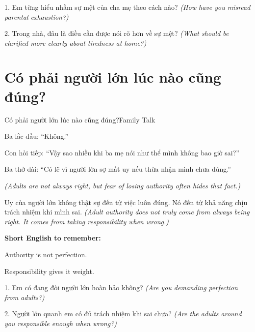 \begin{tuhocnhanh}
1. Em từng hiểu nhầm sự mệt của cha mẹ theo cách nào? \textit{(How have you misread parental exhaustion?)}

2. Trong nhà, đâu là điều cần được nói rõ hơn về sự mệt? \textit{(What should be clarified more clearly about tiredness at home?)}
\end{tuhocnhanh}
\ngancach

\section{Có phải người lớn lúc nào cũng đúng?}
\begin{truyen}{Có phải người lớn lúc nào cũng đúng?}{Family Talk}

Ba lắc đầu: ``Không.''

Con hỏi tiếp: ``Vậy sao nhiều khi ba mẹ nói như thể mình không bao giờ sai?''

Ba thở dài: ``Có lẽ vì người lớn sợ mất uy nếu thừa nhận mình chưa đúng.''

\textit{(Adults are not always right, but fear of losing authority often hides that fact.)}
\end{truyen}

\begin{baihoc}
Uy của người lớn không thật sự đến từ việc luôn đúng. Nó đến từ khả năng chịu trách nhiệm khi mình sai.
\textit{(Adult authority does not truly come from always being right. It comes from taking responsibility when wrong.)}
\end{baihoc}

\begin{ghinhoanh}
\textbf{Short English to remember:}

Authority is not perfection.

Responsibility gives it weight.
\end{ghinhoanh}

\begin{tuhocnhanh}
1. Em có đang đòi người lớn hoàn hảo không? \textit{(Are you demanding perfection from adults?)}

2. Người lớn quanh em có đủ trách nhiệm khi sai chưa? \textit{(Are the adults around you responsible enough when wrong?)}
\end{tuhocnhanh}
\ngancach

